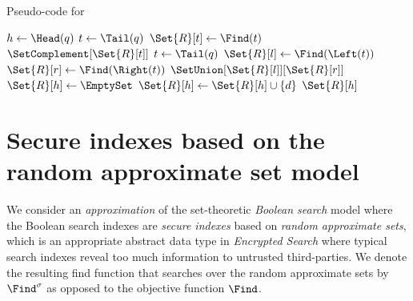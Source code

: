 \documentclass[ ../main.tex]{subfiles}
\begin{document}
\begin{algorithm}[h]
	\caption{Pseudo-code for \protect\Find}
    \label{alg:bool_search}
    {
        $h \gets \Head(q)$\;
        {
        	$t \gets \Tail(q)$\;
        	$\Set{R}[t] \gets \Find(t)$\;
            \Return $\SetComplement[\Set{R}[t]]$\;
        }
        {
        	$t \gets \Tail(q)$\;
            $\Set{R}[l] \gets \Find(\Left(t))$\;
            $\Set{R}[r] \gets \Find(\Right(t))$\;
            \Return $\SetUnion[\Set{R}[l]][\Set{R}[r]]$\;   
        }
        \Else
        {
        	$\Set{R}[h] \gets \EmptySet$\;
        	{
        		{
	        		$\Set{R}[h] \gets \Set{R}[h] \cup \{ d \}$\;
    	    	}
        	}
            \Return $\Set{R}[h]$\;
        }
    }
\end{algorithm}




%



%
%

\section{Secure indexes based on the random approximate set model}
We consider an \emph{approximation} of the set-theoretic \emph{Boolean search} model where the Boolean search indexes are \emph{secure indexes} based on \emph{random approximate sets}, which is an appropriate abstract data type in \emph{Encrypted Search}\cite{es} where typical search indexes reveal too much information to untrusted third-parties.
We denote the resulting find function that searches over the random approximate sets by $\Find^\sigma$ as opposed to the objective function $\Find$.
\end{document}
